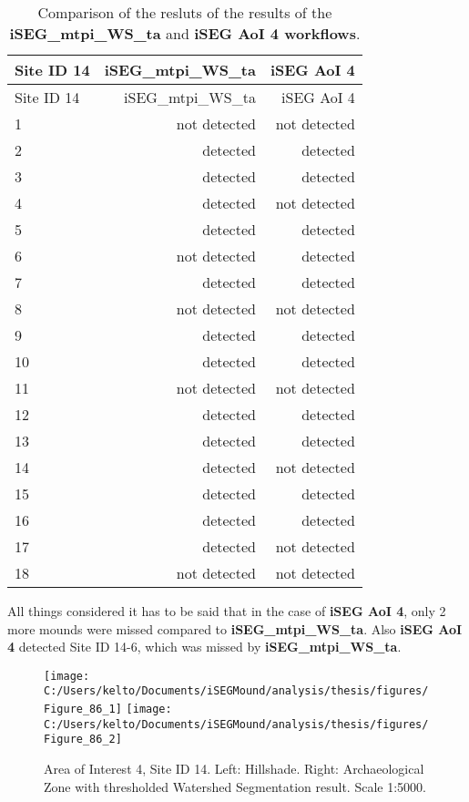 \documentclass[
  12pt,
]{article}
\begin{document}
\begin{longtable}[]{@{}lrr@{}}
\caption{Comparison of the resluts of the results of the \textbf{iSEG\_mtpi\_WS\_ta} and \textbf{iSEG AoI 4 workflows}.}\tabularnewline
\toprule
Site ID 14 & iSEG\_mtpi\_WS\_ta & iSEG AoI 4 \\
\midrule
\endfirsthead
\toprule
Site ID 14 & iSEG\_mtpi\_WS\_ta & iSEG AoI 4 \\
\midrule
\endhead
1 & not detected & not detected \\
2 & detected & detected \\
3 & detected & detected \\
4 & detected & not detected \\
5 & detected & detected \\
6 & not detected & detected \\
7 & detected & detected \\
8 & not detected & not detected \\
9 & detected & detected \\
10 & detected & detected \\
11 & not detected & not detected \\
12 & detected & detected \\
13 & detected & detected \\
14 & detected & not detected \\
15 & detected & detected \\
16 & detected & detected \\
17 & detected & not detected \\
18 & not detected & not detected \\
\bottomrule
\end{longtable}

All things considered it has to be said that in the case of \textbf{iSEG AoI 4}, only 2 more mounds were missed compared to \textbf{iSEG\_mtpi\_WS\_ta}. Also \textbf{iSEG AoI 4} detected Site ID 14-6, which was missed by \textbf{iSEG\_mtpi\_WS\_ta}.

\begin{figure}
\texttt{[image: C:/Users/kelto/Documents/iSEGMound/analysis/thesis/figures/Figure\_86\_1]} \texttt{[image: C:/Users/kelto/Documents/iSEGMound/analysis/thesis/figures/Figure\_86\_2]} \caption{Area of Interest 4, Site ID 14. Left: Hillshade. Right: Archaeological Zone with thresholded Watershed Segmentation result. Scale 1:5000.}\label{fig:Figure86}
\end{figure}
\end{document}
